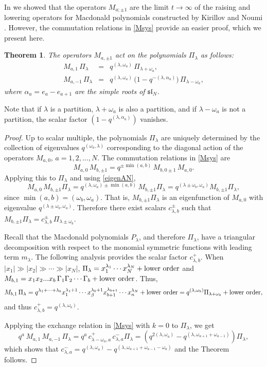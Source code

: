 \documentclass[12pt]{amsart}
\newtheorem{thm}{Theorem}[section]
\renewcommand{\sl}{{\mathfrak{sl}}}
\newcommand{\al}{{\alpha}}
\numberwithin{equation}{section}
\numberwithin{table}{section}
\begin{document}
In \cite{DFK15}  we showed that the operators $M_{a;\pm 1}$ are the limit $t\to\infty$
of the raising and lowering operators for Macdonald polynomials constructed by Kirillov and Noumi \cite{Kinoum}. However, the commutation relations in \eqref{Msys}  provide an easier proof, which we present here.
\begin{thm}\label{KNAN}
The operators $M_{a,\pm 1}$ act on the polynomials $\Pi_\lambda$ as follows:
\begin{eqnarray}
M_{a,1}\, \Pi_\lambda&=& q^{(\lambda,\omega_a)}\, \Pi_{\lambda+\omega_a}, \label{raisingAN}\\
M_{a,-1}\, \Pi_\lambda&=& q^{(\lambda,\omega_a)}\, \big(1-q^{-(\lambda,\al_{a})}\big)\, \Pi_{\lambda-\omega_a}, \label{loweringAN}
\end{eqnarray}
where $\al_a=e_a-e_{a+1}$
are the simple roots of $\sl_N$. 
\end{thm}
Note that if $\lambda$ is a partition, $\lambda+\omega_a$ is also a partition, and if $\lambda-\omega_a$ is not a partition, the scalar factor $(1-q^{(\lambda,\alpha_a)})$ vanishes.
\begin{proof}
Up to scalar multiple, the polynomials $\Pi_\lambda$ are uniquely determined by the collection of eigenvalues $q^{(\omega_a,\lambda)}$ corresponding to the diagonal action of the operators $M_{a,0}$,
$a=1,2,...,N$.
The commutation relations in \eqref{Msys} are
$$ M_{a,0}\, M_{b,\pm 1} =q^{\pm {\min}(a,b)} \, M_{b,0\pm 1}\, M_{a,0}. 
$$
Applying this to $\Pi_\lambda$ and using \eqref{eigenAN},
$$ M_{a,0}\, M_{b,\pm 1} \Pi_\lambda=q^{(\lambda,\omega_a)\pm  {\min}(a,b)}\, M_{b,\pm 1} \Pi_\lambda=q^{(\lambda\pm\omega_b,\omega_a)} M_{b,\pm1}\Pi_\lambda,$$
since ${\min}(a,b)=(\omega_b,\omega_a)$. 
That is, $M_{b,\pm 1} \Pi_\lambda$ is an eigenfunction of $M_{a,0}$
with eigenvalue $q^{(\lambda\pm \omega_b,\omega_a)}$. Therefore
there exist scalars 
$c^\pm_{\lambda,b}$ such that
$M_{b,\pm 1} \Pi_\lambda =c^\pm_{\lambda,b}\,\Pi_{\lambda\pm \omega_b}$.

Recall that the Macdonald polynomials $P_\lambda$, and therefore $\Pi_\lambda$,  have a triangular decomposition with respect to the monomial symmetric functions with leading term $m_\lambda$. The following analysis provides the scalar factor $c^+_{\lambda,b}$.
When
$|x_1|\gg|x_2|\gg \cdots \gg|x_N|$, $\Pi_\lambda =x_1^{\lambda_1}\cdots x_{N}^{\lambda_N}+{\rm lower \ order}$ and
$M_{b,1}=x_1x_2...x_b\, \Gamma_1\Gamma_2\cdots \Gamma_b+{\rm lower \ order}$. Thus,
$$ M_{b,1}\, \Pi_\lambda= q^{\lambda_1+\cdots +\lambda_b} x_1^{\lambda_1+1}\cdots x_\beta^{\lambda_b+1}
x_{b+1}^{\lambda_{b+1}}
\cdots x_n^{\lambda_N}+{\rm lower \ order}=q^{(\lambda,\omega_b)}\Pi_{\lambda+\omega_b}+{\rm lower \ order},$$
and thus $c^+_{\lambda,b}=q^{(\lambda,\omega_b)}$. 

Applying the exchange relation in \eqref{Msys} with $k=0$
to $\Pi_\lambda$, we get
$$q^a\, M_{a,1}\, M_{a,-1}\, \Pi_\lambda=q^{a} \, c^+_{\lambda-\omega_a,a}\, c^-_{\lambda,a} \Pi_\lambda=
(q^{2(\lambda,\omega_a)}-q^{(\lambda,\omega_{a+1}+\omega_{a-1})}) \Pi_\lambda,$$
which shows that $c^-_{\lambda,a}=q^{(\lambda,\omega_a)}-q^{(\lambda,\omega_{a+1}+\omega_{a-1}-\omega_a)}$ and the Theorem follows.
\end{proof}
\end{document}

